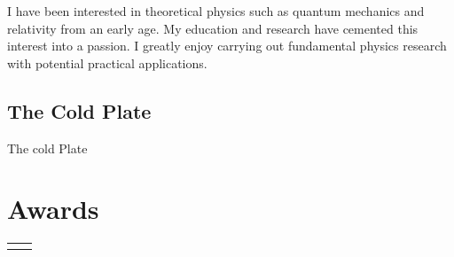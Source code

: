 \documentclass[
	10pt, %
]{FreemanCV}
\begin{document}
\begin{paracol}{2}
I have been interested in theoretical physics such as quantum mechanics and relativity from an early age. My education and research have cemented this interest into a passion. I greatly enjoy carrying out fundamental physics research with potential practical applications.

\subsection{The Cold Plate}

The cold Plate



\section{Awards}




\begin{supertabular}{r l} %
	
	
	
	
	
	
\end{supertabular}



\end{paracol}
\end{document}
